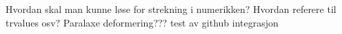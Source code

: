 Hvordan skal man kunne løse for strekning i numerikken?
Hvordan referere til trvalues osv?
Paralaxe deformering???
test av github integrasjon
